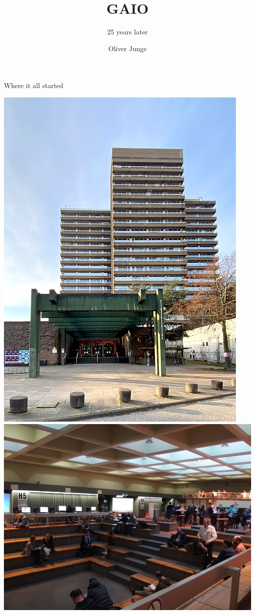 \documentclass[]{beamer}
\title{GAIO}
\subtitle{25 years later}
\author{Oliver Junge}
\institute{Department of Mathematics\\Technical University of Munich}
\date{}
\begin{document}
\maketitle

\begin{frame}{Where it all started}

\begin{center}
\includegraphics[height=0.8\textheight]{figures/geomatikum-1}
\includegraphics[height=0.8\textheight]{figures/geomatikum-2}
\end{center}

\end{frame}
\end{document}
